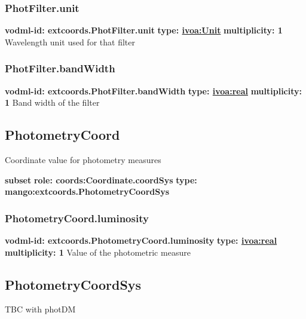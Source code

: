     \subsubsection{PhotFilter.unit}
      \textbf{vodml-id: extcoords.PhotFilter.unit} \newline
      \textbf{type: \hyperref[sect:ivoa]{ivoa:Unit}} \newline
      \textbf{multiplicity: 1} \newline 
      Wavelength unit used for that filter

    \subsubsection{PhotFilter.bandWidth}
      \textbf{vodml-id: extcoords.PhotFilter.bandWidth} \newline
      \textbf{type: \hyperref[sect:ivoa]{ivoa:real}} \newline
      \textbf{multiplicity: 1} \newline 
      Band width of the filter

  \subsection{PhotometryCoord}
  \label{sect:extcoords.PhotometryCoord}
    Coordinate value for photometry measures

    \noindent \textbf{subset} \newline
    \indent   \textbf{role: coords:Coordinate.coordSys} \newline
    \indent   \textbf{type:  mango:extcoords.PhotometryCoordSys} \newline


    \subsubsection{PhotometryCoord.luminosity}
      \textbf{vodml-id: extcoords.PhotometryCoord.luminosity} \newline
      \textbf{type: \hyperref[sect:ivoa]{ivoa:real}} \newline
      \textbf{multiplicity: 1} \newline 
      Value of the photometric measure

  \subsection{PhotometryCoordSys}
  \label{sect:extcoords.PhotometryCoordSys}
    TBC with photDM

